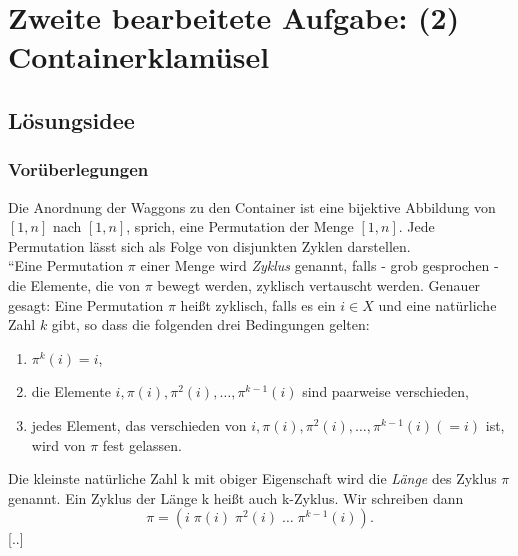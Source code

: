 \section{Zweite bearbeitete Aufgabe: (2) Containerklamüsel}
\subsection{Lösungsidee}
\subsubsection{Vorüberlegungen}
Die Anordnung der Waggons zu den Container ist eine bijektive Abbildung von $[1,n]$ nach $[1,n]$, sprich, eine Permutation der Menge $[1,n]$.
Jede Permutation lässt sich als Folge von disjunkten Zyklen darstellen. \\ %
``Eine Permutation $\pi$ einer Menge wird \emph{Zyklus} genannt, falls - grob gesprochen - die Elemente, die von $\pi$ bewegt werden,
zyklisch vertauscht werden. Genauer gesagt: Eine Permutation $\pi$ heißt zyklisch,
falls es ein $ i \in X$ und eine natürliche Zahl $k$ gibt, so dass die folgenden drei Bedingungen gelten:
\begin{enumerate}
 \item $\pi^k(i) = i$,
 \item die Elemente $i,\pi(i),\pi^2(i),\dots,\pi^{k-1}(i)$ sind paarweise verschieden,
 \item jedes Element, das verschieden von $i,\pi(i),\pi^2(i),\dots,\pi^{k-1}(i) (=i)$ ist, wird von $\pi$ fest gelassen.
\end{enumerate}
Die kleinste natürliche Zahl k mit obiger Eigenschaft wird die \emph{Länge} des Zyklus $\pi$ genannt.
Ein Zyklus der Länge k heißt auch k-Zyklus. Wir schreiben dann \[\pi=(i\;\pi(i)\;\pi^2(i) \; \dots \;\pi^{k-1}(i)).\]
[..]
